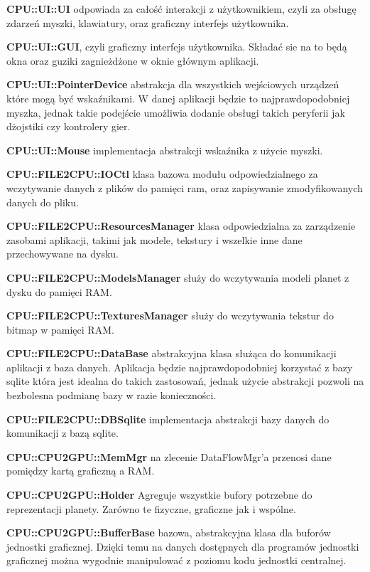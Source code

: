 \begin{description}
\item{\bf CPU::UI::UI} odpowiada za całość interakcji z użytkownikiem, czyli za obsługę zdarzeń myszki, klawiatury, oraz graficzny interfejs użytkownika.
\item{\bf CPU::UI::GUI}, czyli graficzny interfejs użytkownika. Składać sie na to będą okna oraz guziki zagnieżdżone w oknie głównym aplikacji.
\item{\bf CPU::UI::PointerDevice} abstrakcja dla wszystkich wejściowych urządzeń które mogą być wskaźnikami. W danej aplikacji będzie to najprawdopodobniej myszka, jednak takie podejście umożliwia dodanie obsługi takich peryferii jak dżojstiki czy kontrolery gier.
\item{\bf CPU::UI::Mouse} implementacja abstrakcji wskaźnika z użycie myszki.
\item{}
\item{\bf CPU::FILE2CPU::IOCtl} klasa bazowa modułu odpowiedzialnego za wczytywanie danych z plików do pamięci ram, oraz zapisywanie zmodyfikowanych danych do pliku.
\item{\bf CPU::FILE2CPU::ResourcesManager} klasa odpowiedzialna za zarządzenie zasobami aplikacji, takimi jak modele, tekstury i wszelkie inne dane przechowywane na dysku.
\item{\bf CPU::FILE2CPU::ModelsManager} służy do wczytywania modeli planet z dysku do pamięci RAM.
\item{\bf CPU::FILE2CPU::TexturesManager} służy do wczytywania tekstur do bitmap w pamięci RAM.
\item{\bf CPU::FILE2CPU::DataBase} abstrakcyjna klasa służąca do komunikacji aplikacji z baza danych. Aplikacja będzie najprawdopodobniej korzystać z bazy sqlite która jest idealna do takich zastosowań, jednak użycie abstrakcji pozwoli na bezbolesna podmianę bazy w razie konieczności.
\item{\bf CPU::FILE2CPU::DBSqlite} implementacja abstrakcji bazy danych do komunikacji z bazą sqlite.
\item{}
\item{\bf CPU::CPU2GPU::MemMgr} na zlecenie DataFlowMgr'a przenosi dane pomiędzy kartą graficzną a RAM.
\item{\bf CPU::CPU2GPU::Holder} Agreguje wszystkie bufory potrzebne do reprezentacji planety. Zarówno te fizyczne, graficzne jak i wspólne.
\item{\bf CPU::CPU2GPU::BufferBase} bazowa, abstrakcyjna klasa dla buforów jednostki graficznej. Dzięki temu na danych dostępnych dla programów jednostki graficznej można wygodnie manipulować z poziomu kodu jednostki centralnej.

\end{description}
